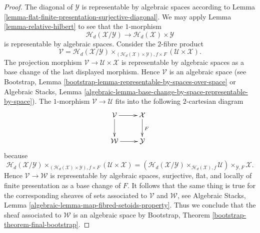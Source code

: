 \documentclass{stacks-project}
\theoremstyle{plain}
\theoremstyle{definition}
\theoremstyle{remark}
\numberwithin{equation}{subsection}
\begin{document}
\begin{proof}
\medskip\noindent
The diagonal of $\mathcal{Y}$ is representable by algebraic spaces according to
Lemma \ref{lemma-flat-finite-presentation-surjective-diagonal}.
We may apply
Lemma \ref{lemma-relative-hilbert}
to see that the $1$-morphism
$$
\mathcal{H}_d(\mathcal{X}/\mathcal{Y})
\longrightarrow
\mathcal{H}_d(\mathcal{X}) \times \mathcal{Y}
$$
is representable by algebraic spaces. Consider the $2$-fibre product
$$
\mathcal{V} =
\mathcal{H}_d(\mathcal{X}/\mathcal{Y})
\times_{(\mathcal{H}_d(\mathcal{X}) \times \mathcal{Y}), f \times F}
(\mathcal{U} \times \mathcal{X}).
$$
The projection morphism $\mathcal{V} \to \mathcal{U} \times \mathcal{X}$
is representable by algebraic spaces as a base change of the last
displayed morphism. Hence $\mathcal{V}$ is an algebraic space (see
Bootstrap, Lemma \ref{bootstrap-lemma-representable-by-spaces-over-space}
or
Algebraic Stacks,
Lemma \ref{algebraic-lemma-base-change-by-space-representable-by-space}).
The $1$-morphism $\mathcal{V} \to \mathcal{U}$ fits into the following
$2$-cartesian diagram
$$
\xymatrix{
\mathcal{V} \ar[d] \ar[r] & \mathcal{X} \ar[d]^F \\
\mathcal{W} \ar[r] & \mathcal{Y}
}
$$
because
$$
\mathcal{H}_d(\mathcal{X}/\mathcal{Y})
\times_{(\mathcal{H}_d(\mathcal{X}) \times \mathcal{Y}), f \times F}
(\mathcal{U} \times \mathcal{X})
=
(\mathcal{H}_d(\mathcal{X}/\mathcal{Y})
\times_{\mathcal{H}_d(\mathcal{X}), f}
\mathcal{U}) \times_{\mathcal{Y}, F} \mathcal{X}.
$$
Hence $\mathcal{V} \to \mathcal{W}$ is representable by algebraic spaces,
surjective, flat, and locally of finite presentation as a base change
of $F$. It follows that the same thing is true for the corresponding
sheaves of sets associated to $\mathcal{V}$ and $\mathcal{W}$, see
Algebraic Stacks, Lemma \ref{algebraic-lemma-map-fibred-setoids-property}.
Thus we conclude that the sheaf associated to $\mathcal{W}$ is an
algebraic space by
Bootstrap, Theorem \ref{bootstrap-theorem-final-bootstrap}.
\end{proof}
\end{document}

